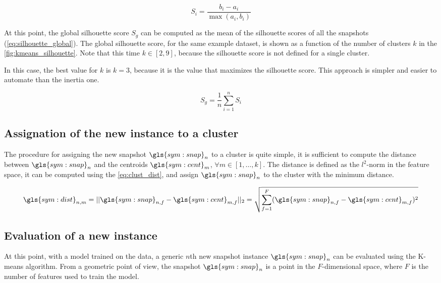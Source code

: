 \begin{equation}
  \label{eq:silhouette}
  S_i = \frac{b_i - a_i}{\max{(a_i,b_i)}}
\end{equation}

At this point, the global silhouette score $S_g$ can be computed as the mean of the silhouette scores of all the snapshots (\autoref{eq:silhouette_global}). The global silhouette score, for the same example dataset, is shown as a function of the number of clusters $k$ in the \autoref{fig:kmeans_silhouette}. Note that this time $k \in [2,9]$, because the silhouette score is not defined for a single cluster.

In this case, the best value for $k$ is $k=3$, because it is the value that maximizes the silhouette score. This approach is simpler and easier to automate than the inertia one. 

\begin{equation}
  \label{eq:silhouette_global}
  S_g = \frac{1}{n}\sum_{i=1}^{n} S_i
\end{equation}

\subsection{Assignation of the new instance to a cluster}
The procedure for assigning the new snapshot $\gls{sym:snap}_n$ to a cluster is quite simple, it is sufficient to compute the distance between $\gls{sym:snap}_n$ and the centroids $\gls{sym:cent}_m$, $\forall m \in  [1, \dots , k]$. The distance is defined as the $l^2$-norm in the feature space, it can be computed using the \autoref{eq:clust_dist}, and assign $\gls{sym:snap}_n$ to the cluster with the minimum distance.

\begin{equation}
  \label{eq:clust_dist}
  \gls{sym:dist}_{n,m} = ||\gls{sym:snap}_{n,f} - \gls{sym:cent}_{m,f}||_2 = \sqrt{\sum_{f=1}^{F} (\gls{sym:snap}_{n,f} - \gls{sym:cent}_{m,f})^2}
\end{equation}

\subsection{Evaluation of a new instance}

At this point, with a model trained on the data, a generic $n$th new snapshot instance $\gls{sym:snap}_n$ can be evaluated using the K-means algorithm.
From a geometric point of view, the snapshot $\gls{sym:snap}_n$ is a point in the ${F}$-dimensional space, where ${F}$ is the number of features used to train the model.

